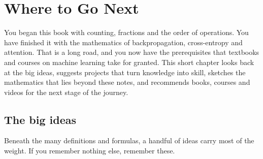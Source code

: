 \chapter{Where to Go Next}\label{ch:next}

\begin{motivation}
You began this book with counting, fractions and the order of operations. You
have finished it with the mathematics of backpropagation, cross-entropy and
attention. That is a long road, and you now have the prerequisites that
textbooks and courses on machine learning take for granted. This short chapter
looks back at the big ideas, suggests projects that turn knowledge into skill,
sketches the mathematics that lies beyond these notes, and recommends books,
courses and videos for the next stage of the journey.
\end{motivation}

\section{The big ideas}\label{sec:big-ideas}

Beneath the many definitions and formulas, a handful of ideas carry most of the
weight. If you remember nothing else, remember these.

